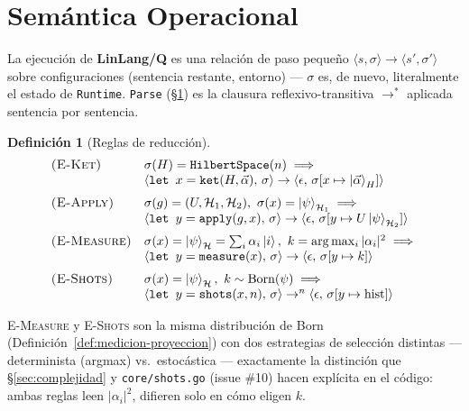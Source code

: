 \documentclass[12pt, a4paper, openany]{report}
\theoremstyle{definition}
\newtheorem{definition}{Definición}[chapter]
\newcommand{\linlangQ}{\textbf{LinLang/Q}}
\newcommand{\Hilbert}{\mathcal{H}}
\newcommand{\ket}[1]{\left|#1\right\rangle}
\begin{document}
\section{Semántica Operacional}
\label{sec:semantica-formal}

La ejecución de \linlangQ{} es una relación de paso pequeño $\langle s, \sigma \rangle \to \langle s', \sigma' \rangle$ sobre configuraciones (sentencia restante, entorno) — $\sigma$ es, de nuevo, literalmente el estado de \texttt{Runtime}. \texttt{Parse} (\S\ref{sec:semantica-formal}) es la clausura reflexivo-transitiva $\to^*$ aplicada sentencia por sentencia.

\begin{definition}[Reglas de reducción]
\label{def:reduccion}
\[
\begin{array}{ll}
\textsc{(E-Ket)} & \sigma(H) = \mathtt{HilbertSpace}(n) \implies \\
  & \langle \texttt{let } x = \mathtt{ket}(H,\vec\alpha),\, \sigma \rangle \to \langle \epsilon,\, \sigma[x \mapsto \ket{\vec\alpha}_H] \rangle \\[0.6em]
\textsc{(E-Apply)} & \sigma(g) = (U, \Hilbert_1, \Hilbert_2),\ \sigma(x) = \ket{\psi}_{\Hilbert_1} \implies \\
  & \langle \texttt{let } y = \mathtt{apply}(g,x),\, \sigma \rangle \to \langle \epsilon,\, \sigma[y \mapsto U\ket{\psi}_{\Hilbert_2}] \rangle \\[0.6em]
\textsc{(E-Measure)} & \sigma(x) = \ket{\psi}_{\Hilbert} = \textstyle\sum_i \alpha_i \ket{i},\ k = \arg\max_i |\alpha_i|^2 \implies \\
  & \langle \texttt{let } y = \mathtt{measure}(x),\, \sigma \rangle \to \langle \epsilon,\, \sigma[y \mapsto k] \rangle \\[0.6em]
\textsc{(E-Shots)} & \sigma(x) = \ket{\psi}_{\Hilbert},\ k \sim \mathrm{Born}(\psi) \implies \\
  & \langle \texttt{let } y = \mathtt{shots}(x,n),\, \sigma \rangle \to^n \langle \epsilon,\, \sigma[y \mapsto \mathrm{hist}] \rangle
\end{array}
\]
\end{definition}

\textsc{E-Measure} y \textsc{E-Shots} son la misma distribución de Born (Definición~\ref{def:medicion-proyeccion}) con dos estrategias de selección distintas — determinista (argmax) vs.\ estocástica — exactamente la distinción que \S\ref{sec:complejidad} y \texttt{core/shots.go} (issue \#10) hacen explícita en el código: ambas reglas leen $|\alpha_i|^2$, difieren solo en cómo eligen $k$.
\end{document}
